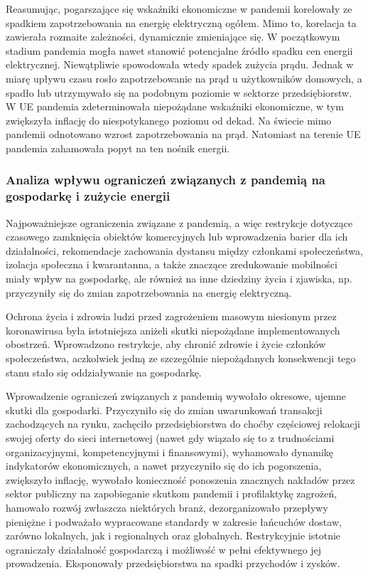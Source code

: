 \documentclass[polish, twoside, 12pt, a4paper]{article}
\theoremstyle{definition}
\theoremstyle{plain}
\theoremstyle{remark}
\begin{document}
Reasumując, pogarszające się wskaźniki ekonomiczne w pandemii korelowały ze spadkiem zapotrzebowania na energię elektryczną ogółem. Mimo to, korelacja ta zawierała rozmaite zależności, dynamicznie zmieniające się. W początkowym stadium pandemia mogła nawet stanowić potencjalne źródło spadku cen energii elektrycznej. Niewątpliwie spowodowała wtedy spadek zużycia prądu. Jednak w miarę upływu czasu rosło zapotrzebowanie na prąd u użytkowników domowych, a spadło lub utrzymywało się na podobnym poziomie w sektorze przedsiębiorstw. W UE pandemia zdeterminowała niepożądane wskaźniki ekonomiczne, w tym zwiększyła inflację do niespotykanego poziomu od dekad. Na świecie mimo pandemii odnotowano wzrost zapotrzebowania na prąd. Natomiast na terenie UE pandemia zahamowała popyt na ten nośnik energii.


\subsubsection{Analiza wpływu ograniczeń związanych z pandemią na gospodarkę i zużycie energii}

Najpoważniejsze ograniczenia związane z pandemią, a więc restrykcje dotyczące czasowego zamknięcia obiektów komercyjnych lub wprowadzenia barier dla ich działalności, rekomendacje zachowania dystansu między członkami społeczeństwa, izolacja społeczna i kwarantanna, a także znaczące zredukowanie mobilności miały wpływ na gospodarkę, ale również na inne dziedziny życia i zjawiska, np. przyczyniły się do zmian zapotrzebowania na energię elektryczną.

Ochrona życia i zdrowia ludzi przed zagrożeniem masowym niesionym przez koronawirusa była istotniejsza aniżeli skutki niepożądane implementowanych obostrzeń. Wprowadzono restrykcje, aby chronić zdrowie i życie członków społeczeństwa, aczkolwiek jedną ze szczególnie niepożądanych konsekwencji tego stanu stało się oddziaływanie na gospodarkę.  

Wprowadzenie ograniczeń związanych z pandemią wywołało okresowe, ujemne skutki dla gospodarki. Przyczyniło się do zmian uwarunkowań transakcji zachodzących na rynku, zachęciło przedsiębiorstwa do choćby częściowej relokacji swojej oferty do sieci internetowej (nawet gdy wiązało się to z trudnościami organizacyjnymi, kompetencyjnymi i finansowymi), wyhamowało dynamikę indykatorów ekonomicznych, a nawet przyczyniło się do ich pogorszenia, zwiększyło inflację, wywołało konieczność ponoszenia znacznych nakładów przez sektor publiczny na zapobieganie skutkom pandemii i profilaktykę zagrożeń, hamowało rozwój zwłaszcza niektórych branż, dezorganizowało przepływy pieniężne i podważało wypracowane standardy w zakresie łańcuchów dostaw, zarówno lokalnych, jak i regionalnych oraz globalnych. Restrykcyjnie istotnie ograniczały działalność gospodarczą i możliwość w pełni efektywnego jej prowadzenia. Eksponowały przedsiębiorstwa na spadki przychodów i zysków. 
\end{document}
